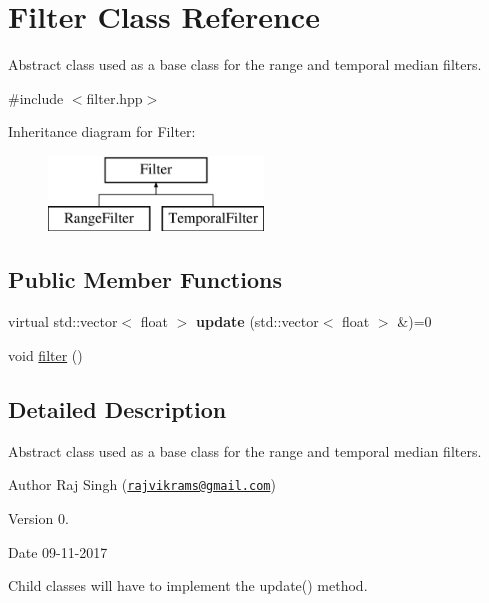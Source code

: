 \hypertarget{class_filter}{}\section{Filter Class Reference}
\label{class_filter}


Abstract class used as a base class for the range and temporal median filters.  




{\ttfamily \#include $<$filter.\+hpp$>$}

Inheritance diagram for Filter\+:\begin{figure}[H]
\begin{center}
\leavevmode
\includegraphics[height=2.000000cm]{class_filter}
\end{center}
\end{figure}
\subsection*{Public Member Functions}
\begin{DoxyCompactItemize}
\item 
\mbox{\label{class_filter_a3a4cfdec9a607efe139b7648dfda0caf}} 
virtual std\+::vector$<$ float $>$ {\bfseries update} (std\+::vector$<$ float $>$ \&)=0
\item 
void \hyperlink{class_filter_a68763fa259eb46616b104d7342d727f1}{filter} ()
\end{DoxyCompactItemize}


\subsection{Detailed Description}
Abstract class used as a base class for the range and temporal median filters. 

\begin{DoxyAuthor}{Author}
Raj Singh (\href{mailto:rajvikrams@gmail.com}{\tt rajvikrams@gmail.\+com}) 
\end{DoxyAuthor}
\begin{DoxyVersion}{Version}
0. 
\end{DoxyVersion}
\begin{DoxyDate}{Date}
09-\/11-\/2017
\end{DoxyDate}
Child classes will have to implement the update() method. 

